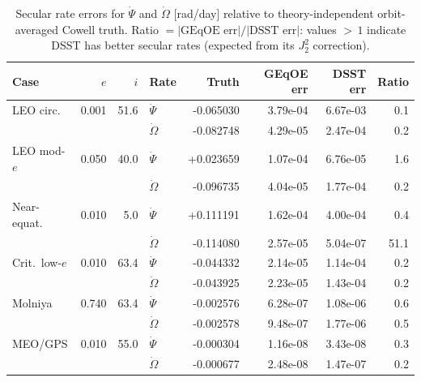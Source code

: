 \begin{table}[ht]
\centering
\caption{Secular rate errors for $\dot\Psi$ and $\dot\Omega$ [rad/day]
relative to theory-independent orbit-averaged Cowell truth.
Ratio $= |\text{GEqOE err}|/|\text{DSST err}|$: values ${>}\,1$
indicate DSST has better secular rates (expected from its $J_2^2$
correction).}
\label{tab:secular_rates}
\small
\begin{tabular}{@{}lrrlrrrr@{}}
\toprule
Case & $e$ & $i$ & Rate & Truth & GEqOE err & DSST err & Ratio \\
\midrule
LEO circ. & 0.001 & 51.6 & $\dot\Psi$ & -0.065030 & 3.79e-04 & 6.67e-03 & 0.1 \\
& & & $\dot\Omega$ & -0.082748 & 4.29e-05 & 2.47e-04 & 0.2 \\
LEO mod-$e$ & 0.050 & 40.0 & $\dot\Psi$ & +0.023659 & 1.07e-04 & 6.76e-05 & 1.6 \\
& & & $\dot\Omega$ & -0.096735 & 4.04e-05 & 1.77e-04 & 0.2 \\
Near-equat. & 0.010 & 5.0 & $\dot\Psi$ & +0.111191 & 1.62e-04 & 4.00e-04 & 0.4 \\
& & & $\dot\Omega$ & -0.114080 & 2.57e-05 & 5.04e-07 & 51.1 \\
Crit.\ low-$e$ & 0.010 & 63.4 & $\dot\Psi$ & -0.044332 & 2.14e-05 & 1.14e-04 & 0.2 \\
& & & $\dot\Omega$ & -0.043925 & 2.23e-05 & 1.43e-04 & 0.2 \\
Molniya & 0.740 & 63.4 & $\dot\Psi$ & -0.002576 & 6.28e-07 & 1.08e-06 & 0.6 \\
& & & $\dot\Omega$ & -0.002578 & 9.48e-07 & 1.77e-06 & 0.5 \\
MEO/GPS & 0.010 & 55.0 & $\dot\Psi$ & -0.000304 & 1.16e-08 & 3.43e-08 & 0.3 \\
& & & $\dot\Omega$ & -0.000677 & 2.48e-08 & 1.47e-07 & 0.2 \\
\bottomrule
\end{tabular}
\end{table}